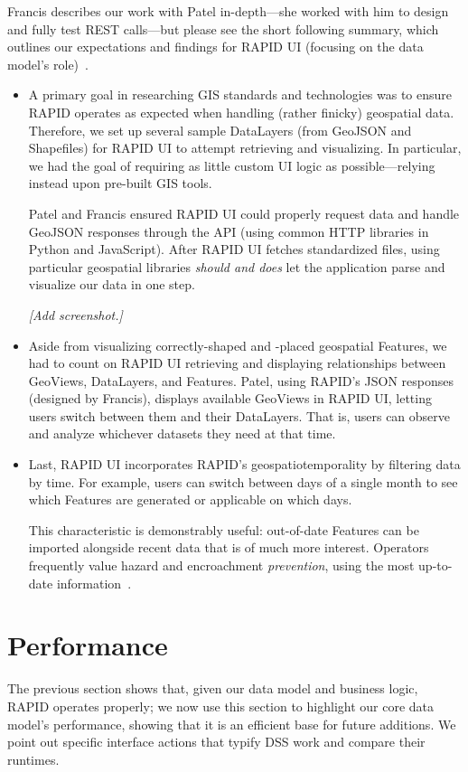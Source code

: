 Francis describes our work with Patel in-depth---she worked with him to design and fully test REST calls---but please see the short following summary, which outlines our expectations and findings for RAPID UI (focusing on the data model's role)~\cite{Francis}.

\begin{itemize}
\item A primary goal in researching GIS standards and technologies was to ensure RAPID operates as expected when handling (rather finicky) geospatial data. Therefore, we set up several sample DataLayers (from GeoJSON and Shapefiles) for RAPID UI to attempt retrieving and visualizing. In particular, we had the goal of requiring as little custom UI logic as possible---relying instead upon pre-built GIS tools.

Patel and Francis ensured RAPID UI could properly request data and handle GeoJSON responses through the API (using common HTTP libraries in Python and JavaScript). After RAPID UI fetches standardized files, using particular geospatial libraries \textit{should and does} let the application parse and visualize our data in one step.

\textit{[Add screenshot.]}

\item Aside from visualizing correctly-shaped and -placed geospatial Features, we had to count on RAPID UI retrieving and displaying relationships between GeoViews, DataLayers, and Features. Patel, using RAPID's JSON responses (designed by Francis), displays available GeoViews in RAPID UI, letting users switch between them and their DataLayers. That is, users can observe and analyze whichever datasets they need at that time.

\item Last, RAPID UI incorporates RAPID's geospatiotemporality by filtering data by time. For example, users can switch between days of a single month to see which Features are generated or applicable on which days.

This characteristic is demonstrably useful: out-of-date Features can be imported alongside recent data that is of much more interest. Operators frequently value hazard and encroachment \textit{prevention}, using the most up-to-date information~\cite{Dunning2013}.
\end{itemize}

\section{Performance}
The previous section shows that, given our data model and business logic, RAPID operates properly; we now use this section to highlight our core data model's performance, showing that it is an efficient base for future additions. We point out specific interface actions that typify DSS work and compare their runtimes.

